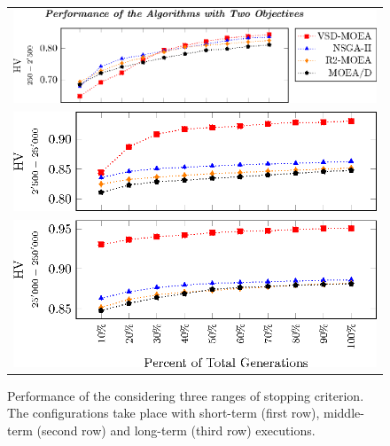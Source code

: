 \begin{figure}[t]
\centering
%
\begin{tabular}{l}
 \includegraphics[scale=0.6]{Images/Time_tikz-figure0.eps}\\[0cm]%
 \includegraphics[scale=0.6]{Images/Time_tikz-figure1.eps}\\[0cm]%
 \includegraphics[scale=0.6]{Images/Time_tikz-figure2.eps}
\end{tabular}
\caption{Performance of the \MOEAS{} considering three ranges of stopping criterion. The configurations take place with short-term (first row), middle-term (second row) and long-term (third row) executions.}\label{fig:Performance_time_2obj}
\end{figure}

